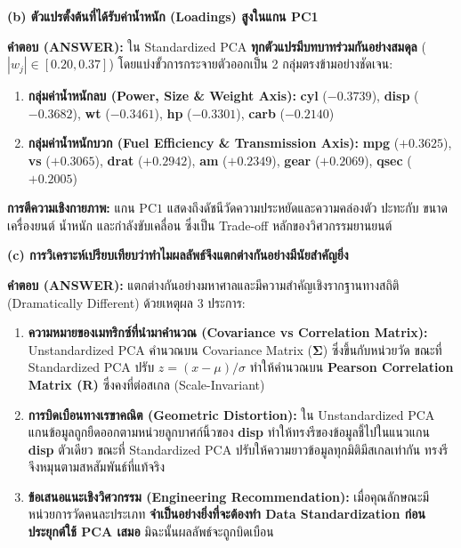 \documentclass[12pt,a4paper]{article}
\newcommand{\codevar}[1]{\textcolor{codeaccent}{\textbf{#1}}}
\begin{document}
\begin{ansbox}[fontupper=\small, left=6pt, right=6pt, top=3pt, bottom=3pt]
\vspace{-0.1em}
\noindent\textbf{\normalsize (b) ตัวแปรตั้งต้นที่ได้รับค่าน้ำหนัก (Loadings) สูงในแกน PC1}\par\vspace{0.05em}
\textbf{คำตอบ (ANSWER):} ใน Standardized PCA \textbf{ทุกตัวแปรมีบทบาทร่วมกันอย่างสมดุล} ($|w_j| \in [0.20, 0.37]$) โดยแบ่งขั้วการกระจายตัวออกเป็น 2 กลุ่มตรงข้ามอย่างชัดเจน:
\begin{enumerate}[leftmargin=1.3em, itemsep=0.5pt, topsep=0.5pt]
    \item \textbf{กลุ่มค่าน้ำหนักลบ (Power, Size \& Weight Axis):} \codevar{cyl} ($-0.3739$), \codevar{disp} ($-0.3682$), \codevar{wt} ($-0.3461$), \codevar{hp} ($-0.3301$), \codevar{carb} ($-0.2140$)
    \item \textbf{กลุ่มค่าน้ำหนักบวก (Fuel Efficiency \& Transmission Axis):} \codevar{mpg} ($+0.3625$), \codevar{vs} ($+0.3065$), \codevar{drat} ($+0.2942$), \codevar{am} ($+0.2349$), \codevar{gear} ($+0.2069$), \codevar{qsec} ($+0.2005$)
\end{enumerate}
\textbf{การตีความเชิงกายภาพ:} แกน $\text{PC1}$ แสดงถึงดัชนีวัดความประหยัดและความคล่องตัว ปะทะกับ ขนาดเครื่องยนต์ น้ำหนัก และกำลังขับเคลื่อน ซึ่งเป็น Trade-off หลักของวิศวกรรมยานยนต์

\vspace{-0.1em}
\noindent\textbf{\normalsize (c) การวิเคราะห์เปรียบเทียบว่าทำไมผลลัพธ์จึงแตกต่างกันอย่างมีนัยสำคัญยิ่ง}\par\vspace{0.05em}
\textbf{คำตอบ (ANSWER):} แตกต่างกันอย่างมหาศาลและมีความสำคัญเชิงรากฐานทางสถิติ (Dramatically Different) ด้วยเหตุผล 3 ประการ:
\begin{enumerate}[leftmargin=1.3em, itemsep=0.5pt, topsep=0.5pt]
    \item \textbf{ความหมายของเมทริกซ์ที่นำมาคำนวณ (Covariance vs Correlation Matrix):} Unstandardized PCA คำนวณบน Covariance Matrix ($\boldsymbol{\Sigma}$) ซึ่งขึ้นกับหน่วยวัด ขณะที่ Standardized PCA ปรับ $z = (x - \mu)/\sigma$ ทำให้คำนวณบน \textbf{Pearson Correlation Matrix ($\mathbf{R}$)} ซึ่งคงที่ต่อสเกล (Scale-Invariant)
    \item \textbf{การบิดเบือนทางเรขาคณิต (Geometric Distortion):} ใน Unstandardized PCA แกนข้อมูลถูกยืดออกตามหน่วยลูกบาศก์นิ้วของ \codevar{disp} ทำให้ทรงรีของข้อมูลชี้ไปในแนวแกน \codevar{disp} ตัวเดียว ขณะที่ Standardized PCA ปรับให้ความยาวข้อมูลทุกมิติมีสเกลเท่ากัน ทรงรีจึงหมุนตามสหสัมพันธ์ที่แท้จริง
    \item \textbf{ข้อเสนอแนะเชิงวิศวกรรม (Engineering Recommendation):} เมื่อคุณลักษณะมีหน่วยการวัดคนละประเภท \textbf{จำเป็นอย่างยิ่งที่จะต้องทำ Data Standardization ก่อนประยุกต์ใช้ PCA เสมอ} มิฉะนั้นผลลัพธ์จะถูกบิดเบือน
\end{enumerate}
\end{ansbox}
\end{document}
